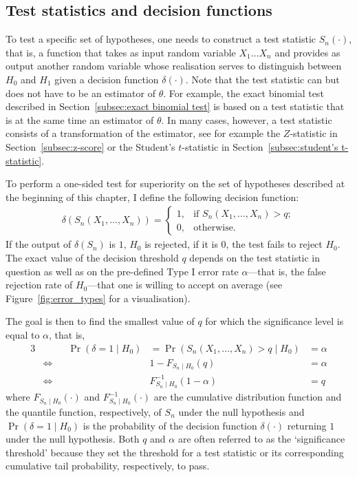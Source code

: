 \subsection{Test statistics and decision functions}
\label{subsec:decision_function}
To test a specific set of hypotheses, one needs to construct a test statistic $S_n(\cdot)$, that is, a function that takes as input random variable $X_1 \dots X_n$ and provides as output another random variable whose realisation serves to distinguish between $H_0$ and $H_1$ given a decision function $\delta(\cdot)$. Note that the test statistic can but does not have to be an estimator of $\theta$. For example, the exact binomial test described in Section~\ref{subsec:exact binomial test} is based on a test statistic that is at the same time an estimator of $\theta$. In many cases, however, a test statistic consists of a transformation of the estimator, see for example the $Z$-statistic in Section~\ref{subsec:z-score} or the Student's $t$-statistic in Section~\ref{subsec:student's t-statistic}.\par
To perform a one-sided test for superiority on the set of hypotheses described at the beginning of this chapter, I define the following decision function:
\begin{align*}
    \delta(S_n(X_1,\dots,X_n)) = \begin{cases} 1, & \text{if } S_n(X_1,\dots,X_n) > q; \\ 
    0, & \mbox{otherwise.}\end{cases}
\end{align*}
If the output of $\delta(S_n)$ is $1$, $H_0$ is rejected, if it is $0$, the test fails to reject $H_0$. The exact value of the decision threshold $q$ depends on the test statistic in question as well as on the pre-defined Type I error rate $\alpha$---that is, the false rejection rate of $H_0$---that one is willing to accept on average (see Figure~\ref{fig:error_types} for a visualisation).\par
The goal is then to find the smallest value of $q$ for which the significance level is equal to $\alpha$, that is, 
\begin{alignat*}{3}
    &\phantom{\Longleftrightarrow\quad}\Pr(\delta=1\mid H_0) &= \Pr(S_n(X_1,\dots,X_n) > q\mid H_0) &= \alpha \\
    &\Longleftrightarrow\quad & 1-F_{S_n\mid H_0}(q) &=\alpha \\
    &\Longleftrightarrow\quad & F^{-1}_{S_n\mid H_0}(1-\alpha) &= q
\end{alignat*}
where ${F_{S_n\mid H_0}(\cdot)}$ and ${F^{-1}_{S_n\mid H_0}(\cdot)}$ are the cumulative distribution function and the quantile function, respectively, of $S_n$ under the null hypothesis and ${\Pr(\delta=1\mid H_0)}$ is the probability of the decision function $\delta(\cdot)$ returning $1$ under the null hypothesis. Both $q$ and $\alpha$ are often referred to as the `significance threshold' because they set the threshold for a test statistic or its corresponding cumulative tail probability, respectively, to pass.\par %


